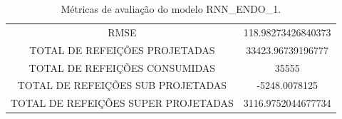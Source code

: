                 \begin{table}[!ht]
                   \centering
                   \caption{Métricas de avaliação do modelo RNN\_ENDO\_1.}
                \begin{tabular}{|c|c|}
                \rowcolor{gray!50} \hline
                \multicolumn{2}{c}{ METRICAS DO MODELO RNN\_ENDO\_1 : }\\ \hline
                RMSE & 118.98273426840373\\
                TOTAL DE REFEIÇÕES PROJETADAS & 33423.96739196777\\
                TOTAL DE REFEIÇÕES CONSUMIDAS & 35555\\
                TOTAL DE REFEIÇÕES SUB PROJETADAS & -5248.0078125\\
                TOTAL DE REFEIÇÕES SUPER PROJETADAS & 3116.9752044677734\\
                \hline
                \end{tabular}\end{table}

